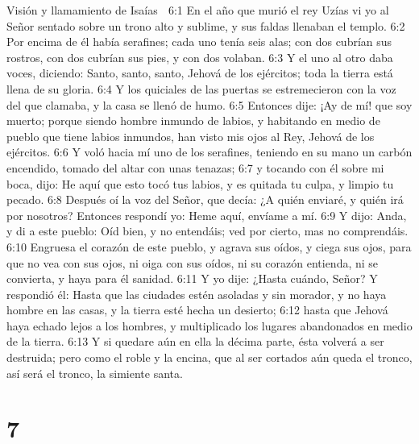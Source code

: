Visión y llamamiento de Isaías  

6:1 En el año que murió el rey Uzías vi yo al Señor sentado sobre un trono alto y sublime, y sus faldas llenaban el templo.  
6:2 Por encima de él había serafines; cada uno tenía seis alas; con dos cubrían sus rostros, con dos cubrían sus pies, y con dos volaban.  
6:3 Y el uno al otro daba voces, diciendo: Santo, santo, santo, Jehová de los ejércitos; toda la tierra está llena de su gloria.  
6:4 Y los quiciales de las puertas se estremecieron con la voz del que clamaba, y la casa se llenó de humo. 
6:5 Entonces dije: ¡Ay de mí! que soy muerto; porque siendo hombre inmundo de labios, y habitando en medio de pueblo que tiene labios inmundos, han visto mis ojos al Rey, Jehová de los ejércitos.  
6:6 Y voló hacia mí uno de los serafines, teniendo en su mano un carbón encendido, tomado del altar con unas tenazas;  
6:7 y tocando con él sobre mi boca, dijo: He aquí que esto tocó tus labios, y es quitada tu culpa, y limpio tu pecado.  
6:8 Después oí la voz del Señor, que decía: ¿A quién enviaré, y quién irá por nosotros? Entonces respondí yo: Heme aquí, envíame a mí.  
6:9 Y dijo: Anda, y di a este pueblo: Oíd bien, y no entendáis; ved por cierto, mas no comprendáis.  
6:10 Engruesa el corazón de este pueblo, y agrava sus oídos, y ciega sus ojos, para que no vea con sus ojos, ni oiga con sus oídos, ni su corazón entienda, ni se convierta, y haya para él sanidad. 
6:11 Y yo dije: ¿Hasta cuándo, Señor? Y respondió él: Hasta que las ciudades estén asoladas y sin morador, y no haya hombre en las casas, y la tierra esté hecha un desierto;  
6:12 hasta que Jehová haya echado lejos a los hombres, y multiplicado los lugares abandonados en medio de la tierra.  
6:13 Y si quedare aún en ella la décima parte, ésta volverá a ser destruida; pero como el roble y la encina, que al ser cortados aún queda el tronco, así será el tronco, la simiente santa.  

\chapter{7}

